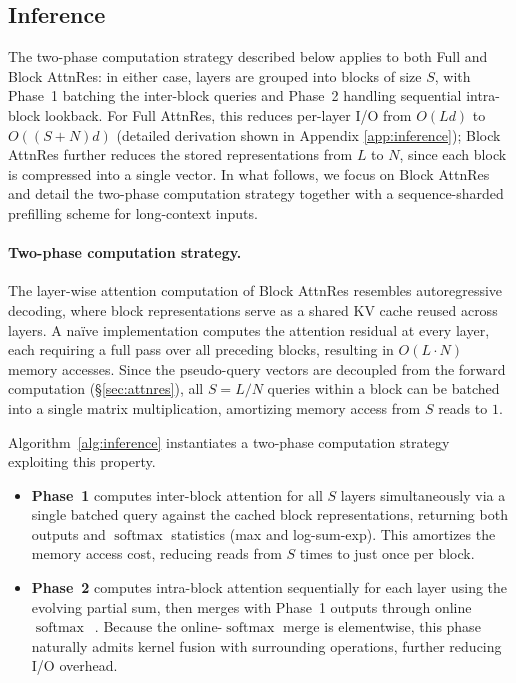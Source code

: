 \subsection{Inference}
\label{sec:infra-inference}
The two-phase computation strategy described below applies to both Full and Block AttnRes: in either case, layers are grouped into blocks of size $S$, with Phase~1 batching the inter-block queries and Phase~2 handling sequential intra-block lookback. For Full AttnRes, this reduces per-layer I/O from $O(Ld)$ to $O((S{+}N)d)$ (detailed derivation shown in Appendix \ref{app:inference}); Block AttnRes further reduces the stored representations from $L$ to $N$, since each block is compressed into a single vector.
In what follows, we focus on Block AttnRes and detail the two-phase computation strategy together with a sequence-sharded prefilling scheme for long-context inputs.

\paragraph{Two-phase computation strategy.}
The layer-wise attention computation of Block AttnRes resembles autoregressive decoding, where block representations serve as a shared KV cache reused across layers.
A na\"ive implementation computes the attention residual at every layer, each requiring a full pass over all preceding blocks, resulting in $O(L \cdot N)$ memory accesses.
Since the pseudo-query vectors are decoupled from the forward computation (\S\ref{sec:attnres}), all $S = L/N$ queries within a block can be batched into a single matrix multiplication, amortizing memory access from $S$ reads to $1$.

Algorithm~\ref{alg:inference} instantiates a two-phase computation strategy exploiting this property.
\begin{itemize}[leftmargin=*]
    \item \textbf{Phase~1} computes inter-block attention for all $S$ layers simultaneously via a single batched query against the cached block representations, returning both outputs and $\operatorname{softmax}$ statistics (max and log-sum-exp). This amortizes the memory access cost, reducing reads from $S$ times to just once per block.
    \item \textbf{Phase~2} computes intra-block attention sequentially for each layer using the evolving partial sum, then merges with Phase~1 outputs through online $\operatorname{softmax}$~\citep{milakov2018online}. Because the online-$\operatorname{softmax}$ merge is elementwise, this phase naturally admits kernel fusion with surrounding operations, further reducing I/O overhead.
\end{itemize}

